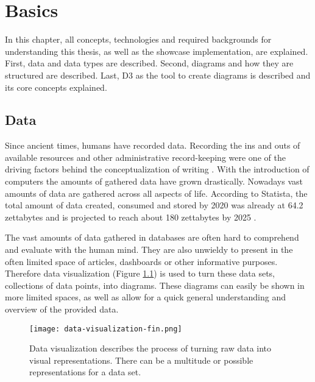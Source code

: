 \chapter{Basics}

In this chapter, all concepts, technologies and required backgrounds for understanding this thesis, as well as the showcase implementation, are explained. First, data and data types are described. Second, diagrams and how they are structured are described. Last, D3 as the tool to create diagrams is described and its core concepts explained.


\section{Data}

Since ancient times, humans have recorded data. Recording the ins and outs of available resources and other administrative record-keeping were one of the driving factors behind the conceptualization of writing \cite{senner1991origins}.
With the introduction of computers the amounts of gathered data have grown drastically. Nowadays vast amounts of data are gathered across all aspects of life. According to Statista, the total amount of data created, consumed and stored by 2020 was already at 64.2 zettabytes and is projected to reach about 180 zettabytes by 2025 \cite{statista_2022}.

The vast amounts of data gathered in databases are often hard to comprehend and evaluate with the human mind. They are also unwieldy to present in the often limited space of articles, dashboards or other informative purposes. Therefore data visualization (Figure \ref{fig:data-visualization}) is used to turn these data sets, collections of data points, into diagrams. These diagrams can easily be shown in more limited spaces, as well as allow for a quick general understanding and overview of the provided data.

\begin{figure}
    \texttt{[image: data-visualization-fin.png]}
    \captionsetup{width=0.9\textwidth}
    \caption[data-visualization]{Data visualization describes the process of turning raw data into visual representations. There can be a multitude or possible representations for a data set.}
    \label{fig:data-visualization}
\end{figure}

